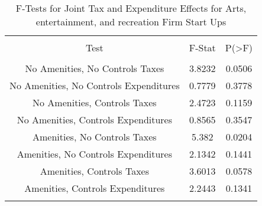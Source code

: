 
\begin{table}[!htbp] \centering 
  \caption{F-Tests for Joint Tax and Expenditure Effects for Arts, entertainment, and recreation Firm Start Ups} 
  \label{71Ftests} 
\begin{tabular}{@{\extracolsep{5pt}} ccc} 
\\[-1.8ex]\hline 
\hline \\[-1.8ex] 
Test & F-Stat & P(\textgreater F) \\ 
\hline \\[-1.8ex] 
No Amenities, No Controls Taxes & 3.8232 & 0.0506 \\ 
No Amenities, No Controls Expenditures & 0.7779 & 0.3778 \\ 
No Amenities, Controls Taxes & 2.4723 & 0.1159 \\ 
No Amenities, Controls Expenditures & 0.8565 & 0.3547 \\ 
Amenities, No Controls Taxes & 5.382 & 0.0204 \\ 
Amenities, No Controls Expenditures & 2.1342 & 0.1441 \\ 
Amenities, Controls Taxes & 3.6013 & 0.0578 \\ 
Amenities, Controls Expenditures & 2.2443 & 0.1341 \\ 
\hline \\[-1.8ex] 
\end{tabular} 
\end{table} 

